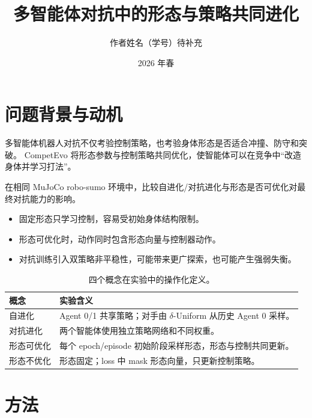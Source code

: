 \documentclass[final]{beamer}
\title
[具身智能课程 ~$\cdot$~ 多智能体对抗进化 ~$\cdot$~ 2026 年春]
{多智能体对抗中的形态与策略共同进化}
\author{作者姓名（学号）待补充}
\institute
[清华大学]
{
指导教师：刘华平\\[-0.2ex]
具身智能课程大作业，清华大学
}
\date{2026 年春}
\begin{document}
\begin{frame}[t]
\begin{multicols}{3}
\raggedcolumns

\section{问题背景与动机}

多智能体机器人对抗不仅考验控制策略，也考验身体形态是否适合冲撞、防守和突破。
CompetEvo 将形态参数与控制策略共同优化，使智能体可以在竞争中“改造身体并学习打法”。

 在相同 MuJoCo robo-sumo 环境中，比较自进化/对抗进化与形态是否可优化对最终对抗能力的影响。

\begin{itemize}
  \item 固定形态只学习控制，容易受初始身体结构限制。
  \item 形态可优化时，动作同时包含形态向量与控制器动作。
  \item 对抗训练引入双策略非平稳性，可能带来更广探索，也可能产生强弱失衡。
\end{itemize}

\begin{table}
\centering
\scriptsize
\caption{四个概念在实验中的操作化定义。}
\begin{tabularx}{\columnwidth}{@{}lY@{}}
\toprule
概念 & 实验含义\\
\midrule
自进化 & Agent 0/1 共享策略；对手由 $\delta$-Uniform 从历史 Agent 0 采样。\\
对抗进化 & 两个智能体使用独立策略网络和不同权重。\\
形态可优化 & 每个 epoch/episode 初始阶段采样形态，形态与控制共同更新。\\
形态不优化 & 形态固定；loss 中 mask 形态向量，只更新控制策略。\\
\bottomrule
\end{tabularx}
\end{table}

\section{方法}


\end{multicols}
\end{frame}
\end{document}
